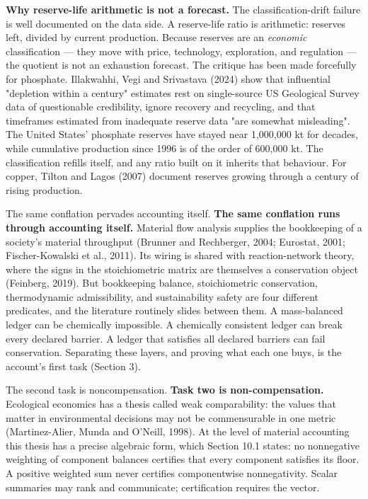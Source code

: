 \documentclass[11pt]{article}
\begin{document}
\textbf{Why reserve-life arithmetic is not a forecast.} The classification-drift failure is well documented on the data side. A reserve-life ratio is arithmetic: reserves left, divided by current production. Because reserves are an \emph{economic} classification --- they move with price, technology, exploration, and regulation --- the quotient is not an exhaustion forecast. The critique has been made forcefully for phosphate. Illakwahhi, Vegi and Srivastava (2024) show that influential "depletion within a century" estimates rest on single-source US Geological Survey data of questionable credibility, ignore recovery and recycling, and that timeframes estimated from inadequate reserve data "are somewhat misleading". The United States' phosphate reserves have stayed near 1,000,000 kt for decades, while cumulative production since 1996 is of the order of 600,000 kt. The classification refills itself, and any ratio built on it inherits that behaviour. For copper, Tilton and Lagos (2007) document reserves growing through a century of rising production.

The same conflation pervades accounting itself. \textbf{The same conflation runs through accounting itself.} Material flow analysis supplies the bookkeeping of a society's material throughput (Brunner and Rechberger, 2004; Eurostat, 2001; Fischer-Kowalski et al., 2011). Its wiring is shared with reaction-network theory, where the signs in the stoichiometric matrix are themselves a conservation object (Feinberg, 2019). But bookkeeping balance, stoichiometric conservation, thermodynamic admissibility, and sustainability safety are four different predicates, and the literature routinely slides between them. A mass-balanced ledger can be chemically impossible. A chemically consistent ledger can break every declared barrier. A ledger that satisfies all declared barriers can fail conservation. Separating these layers, and proving what each one buys, is the account's first task (Section 3).

The second task is noncompensation. \textbf{Task two is non-compensation.} Ecological economics has a thesis called weak comparability: the values that matter in environmental decisions may not be commensurable in one metric (Martinez-Alier, Munda and O'Neill, 1998). At the level of material accounting this thesis has a precise algebraic form, which Section 10.1 states: no nonnegative weighting of component balances certifies that every component satisfies its floor. A positive weighted sum never certifies componentwise nonnegativity. Scalar summaries may rank and communicate; certification requires the vector.
\end{document}
